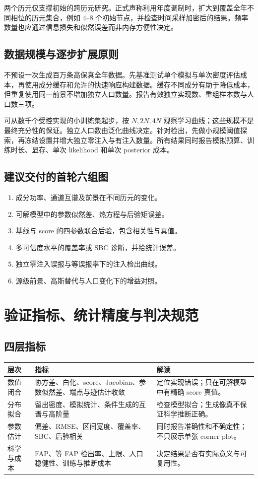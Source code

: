 \documentclass[UTF8,fontset=fandol,a4paper,11pt]{ctexart}
\numberwithin{equation}{section}
\begin{document}
两个历元仅支撑初始的跨历元研究。正式声称利用年度调制时，扩大到覆盖全年不同相位的历元集合，例如 4--8 个初始节点，并检查时间采样加密后的结果。频率数量也应通过信息损失和似然误差而非内存方便性决定。

\subsection{数据规模与逐步扩展原则}
不预设一次生成百万条高保真全年数据。先基准测试单个模拟与单次密度评估成本，再使用成分缓存和允许的快速响应构建数据。缓存不同成分有助于降低成本，但重复使用同一前景不增加独立人口数量。报告有效独立实现数、重组样本数与人口数三项。

可从数千个受控实现的小训练集起步，按 $N,2N,4N$ 观察学习曲线；这些规模不是最终充分性的保证。独立人口数由泛化曲线决定。针对检出，先做小规模阈值探索，再冻结设置并增大独立零注入与有注入数量。所有结果同时报告模拟预算、训练时长、显存、单次 likelihood 和单次 posterior 成本。

\subsection{建议交付的首轮六组图}
\begin{enumerate}
\item 成分功率、通道互谱及前景在不同历元的变化。
\item 可解模型中的参数似然差、热方程与后验矩误差。
\item 基线与 score 的四参数联合后验，包含相关性与真值。
\item 多可信度水平的覆盖率或 SBC 诊断，并给统计误差。
\item 独立零注入误报与等误报率下的注入检出曲线。
\item 源级前景、高斯替代与人口变化下的增益对照。
\end{enumerate}

\section{验证指标、统计精度与判决规范}
\subsection{四层指标}
\par\noindent\begin{minipage}{\linewidth}\centering
\begin{tabular}{P{2.1cm}P{5.7cm}P{6.3cm}}
\toprule 层次 & 指标 & 解读\\\midrule
数值闭合 & 协方差、白化、score、Jacobian、参数似然差、端点与迹估计收敛 & 定位实现错误；只在可解模型中有精确 score 真值。\\
分布拟合 & 留出密度、模拟统计、条件生成的互谱与高阶量 & 检查模型拟合；生成像真不保证科学推断正确。\\
参数估计 & 偏差、RMSE、区间宽度、覆盖率、SBC、后验相关 & 同时报告准确性和不确定性；不只展示单张 corner plot。\\
科学与成本 & FAP、等 FAP 检出率、上限、人口稳健性、训练与推断成本 & 决定结果是否有实际意义与可复用性。\\\bottomrule
\end{tabular}
\end{minipage}\par\smallskip
\end{document}
